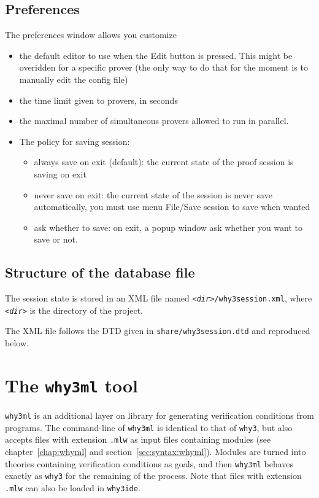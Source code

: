 \subsection{Preferences}

The preferences window allows you customize
\begin{itemize}
\item the default editor to use when the \textsf{Edit} button is
  pressed. This might be overidden for a specific prover (the only way
  to do that for the moment is to manually edit the config file)
\item the time limit given to provers, in seconds
\item the maximal number of simultaneous provers allowed to run in parallel.
\item The policy for saving session:
  \begin{itemize}
  \item always save on exit (default): the current state of the proof session is saving on exit
  \item never save on exit: the current state of the session is never save automatically, you must use menu \textsf{File/Save session} to save when wanted
  \item ask whether to save: on exit, a popup window ask whether you
    want to save or not.
  \end{itemize}
\end{itemize}

\subsection{Structure of the database file}

The session state is stored in an XML file named
\texttt{\textsl{<dir>}/why3session.xml}, where \texttt{\textsl{<dir>}}
is the directory of the project.

The XML file follows the DTD given in \texttt{share/why3session.dtd} and reproduced below.


\section{The \texttt{why3ml} tool}

\texttt{why3ml} is an additional layer on \why library for
generating verification conditions from \whyml programs.
The command-line of \texttt{why3ml} is identical to that of
\texttt{why3}, but also accepts files with extension \texttt{.mlw} as
input files containing \whyml modules (see chapter~\ref{chap:whyml}
and section~\ref{sec:syntax:whyml}). Modules are turned into
theories containing verification conditions as goals, and then
\texttt{why3ml} behaves exactly as \texttt{why3} for the remaining of
the process.
Note that files with extension \texttt{.mlw} can also be loaded in
\texttt{why3ide}.

